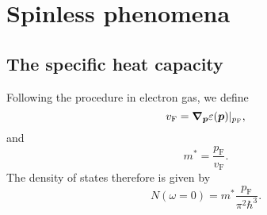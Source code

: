 \documentclass[hyperref, a4paper]{article}
\newcommand*{\pfermi}{p_{\text{F}}}
\newcommand*{\vfermi}{v_{\text{F}}}
\begin{document}
\section{Spinless phenomena}

\subsection{The specific heat capacity}

Following the procedure in electron gas, 
we define 
\begin{equation}
    \vfermi = \grad_{\vb*{p}} \varepsilon(\vb*{p}) |_{\pfermi}, 
\end{equation}
and 
\begin{equation}
    m^* = \frac{\pfermi}{\vfermi}.
\end{equation}
The density of states therefore is given by 
\begin{equation}
    N(\omega = 0) = m^* \frac{\pfermi}{\pi^2 \hbar^3}.
\end{equation}
\end{document}
